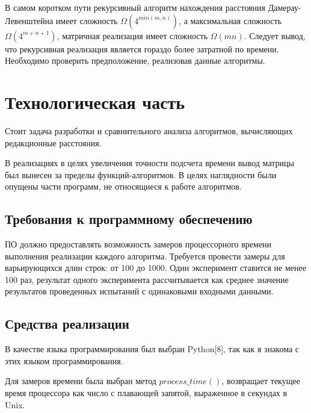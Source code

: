 \documentclass[a4paper,14pt]{article} %
\begin{document}
	В самом коротком пути рекурсивный алгоритм нахождения расстояния Дамерау-Левенштейна имеет сложность $\Omega(4^{min(m,n)})$, а максимальная сложность $\Omega(4^{m + n + 1})$, матричная реализация имеет сложность $\Omega(mn)$. Следует вывод, что рекурсивная реализация является гораздо более затратной по времени. Необходимо проверить предположение, реализовав данные алгоритмы. 

    \newpage

        \section{Технологическая часть}
        
        \hfill
        
        Стоит задача разработки и сравнительного анализа алгоритмов, вычисляющих редакционные расстояния. 
        \hfill
        
        В реализациях в целях увеличения точности подсчета времени вывод матрицы был вынесен за пределы функций-алгоритмов. В целях наглядности были опущены части программ, не относящиеся к работе алгоритмов.
        
        \subsection{Требования к программному обеспечению}
        \hfill
        
        ПО должно предоставлять возможность замеров процессорного времени выполнения реализации каждого алгоритма. Требуется провести замеры для варьирующихся длин строк: от 100 до 1000. Один эксперимент ставится не менее 100 раз, результат одного эксперимента рассчитывается как среднее значение результатов проведенных испытаний с одинаковыми входными данными.
        \hfill
        
        \subsection{Средства реализации}
        \hfill
        
        В качестве языка программирования был выбран Python[8], так как я знакома с этих языком программирования. 
        
        \hfill
        
        Для замеров времени была выбран метод $process\_time()$, возвращает текущее время процессора как число с плавающей запятой, выраженное в секундах в Unix.
        \hfill
        
\end{document}
